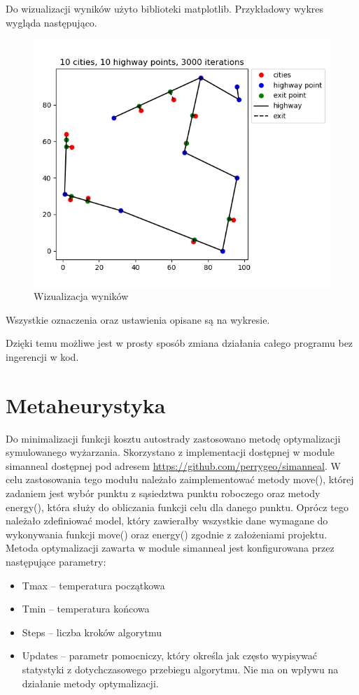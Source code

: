 \documentclass[a4paper]{article}
\begin{document}
Do wizualizacji wyników użyto biblioteki matplotlib. Przykładowy wykres wygląda następująco.
\begin{figure}[h]
\centering
\includegraphics[width=12cm]{sample}
\caption{Wizualizacja wyników}
\end{figure}
Wszystkie oznaczenia oraz ustawienia opisane są na wykresie.



Dzięki temu możliwe jest w prosty sposób zmiana działania całego programu bez ingerencji w kod.


\section{Metaheurystyka}
Do minimalizacji funkcji kosztu autostrady zastosowano metodę optymalizacji symulowanego wyżarzania. Skorzystano z implementacji dostępnej w module simanneal dostępnej pod adresem \url{https://github.com/perrygeo/simanneal}. W celu zastosowania tego modułu należało zaimplementować metody move(), której zadaniem jest wybór punktu z sąsiedztwa punktu roboczego oraz metody energy(), która służy do obliczania funkcji celu dla danego punktu. Oprócz tego należało zdefiniować model, który zawierałby wszystkie dane wymagane do wykonywania funkcji move() oraz energy() zgodnie z założeniami projektu.
Metoda optymalizacji zawarta w module simanneal jest konfigurowana przez następujące parametry:
\begin{itemize}
\item Tmax – temperatura początkowa
\item Tmin – temperatura końcowa
\item Steps – liczba kroków algorytmu
\item Updates – parametr pomocniczy, który określa jak często wypisywać statystyki z dotychczasowego przebiegu algorytmu. Nie ma on wpływu na działanie metody optymalizacji.
\end{itemize}
\end{document}
